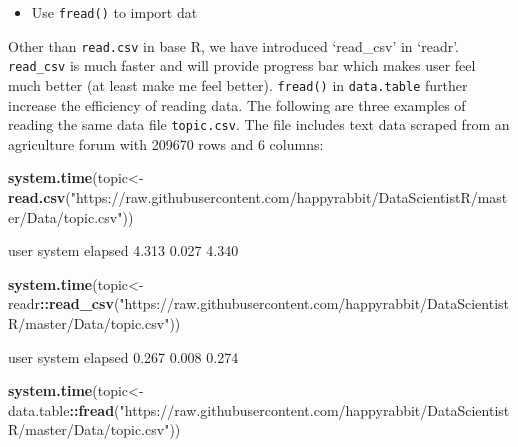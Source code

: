 \documentclass[12pt,]{krantz}
\makeatletter
\newenvironment{Shaded}{\begin{snugshade}}{\end{snugshade}}
\newcommand{\KeywordTok}[1]{\textcolor[rgb]{0.27,0.27,0.27}{\textbf{#1}}}
\newcommand{\StringTok}[1]{\textcolor[rgb]{0.5,0.5,0.5}{#1}}
\newcommand{\OperatorTok}[1]{\textcolor[rgb]{0.43,0.43,0.43}{\textbf{#1}}}
\newcommand{\NormalTok}[1]{#1}
\providecommand{\tightlist}{%
  \setlength{\itemsep}{0pt}\setlength{\parskip}{0pt}}
\newenvironment{kframe}{%
\medskip{}
\setlength{\fboxsep}{.8em}
 \def\at@end@of@kframe{}%
 \ifinner\ifhmode%
  \def\at@end@of@kframe{\end{minipage}}%
  \begin{minipage}{\columnwidth}%
 \fi\fi%
 \def\FrameCommand##1{\hskip\@totalleftmargin \hskip-\fboxsep
 \colorbox{shadecolor}{##1}\hskip-\fboxsep
     \hskip-\linewidth \hskip-\@totalleftmargin \hskip\columnwidth}%
 \MakeFramed {\advance\hsize-\width
   \@totalleftmargin\z@ \linewidth\hsize
   \@setminipage}}%
 {\par\unskip\endMakeFramed%
 \at@end@of@kframe}
\renewenvironment{Shaded}{\begin{kframe}}{\end{kframe}}
\theoremstyle{definition}
\theoremstyle{definition}
\theoremstyle{definition}
\theoremstyle{remark}
\makeatother
\begin{document}
\begin{itemize}
\tightlist
\item
  Use \texttt{fread()} to import dat
\end{itemize}

Other than \texttt{read.csv} in base R, we have introduced `read\_csv'
in `readr'. \texttt{read\_csv} is much faster and will provide progress
bar which makes user feel much better (at least make me feel better).
\texttt{fread()} in \texttt{data.table} further increase the efficiency
of reading data. The following are three examples of reading the same
data file \texttt{topic.csv}. The file includes text data scraped from
an agriculture forum with 209670 rows and 6 columns:

\begin{Shaded}
\begin{Highlighting}[]
\KeywordTok{system.time}\NormalTok{(topic<-}\KeywordTok{read.csv}\NormalTok{(}\StringTok{"https://raw.githubusercontent.com/happyrabbit/DataScientistR/master/Data/topic.csv"}\NormalTok{))}
\end{Highlighting}
\end{Shaded}

\begin{Shaded}
\begin{Highlighting}[]
\NormalTok{  user  system elapsed }
\NormalTok{  4.313   0.027   4.340}
\end{Highlighting}
\end{Shaded}

\begin{Shaded}
\begin{Highlighting}[]
\KeywordTok{system.time}\NormalTok{(topic<-readr}\OperatorTok{::}\KeywordTok{read_csv}\NormalTok{(}\StringTok{"https://raw.githubusercontent.com/happyrabbit/DataScientistR/master/Data/topic.csv"}\NormalTok{))}
\end{Highlighting}
\end{Shaded}

\begin{Shaded}
\begin{Highlighting}[]
\NormalTok{   user  system elapsed }
\NormalTok{  0.267   0.008   0.274 }
\end{Highlighting}
\end{Shaded}

\begin{Shaded}
\begin{Highlighting}[]
\KeywordTok{system.time}\NormalTok{(topic<-data.table}\OperatorTok{::}\KeywordTok{fread}\NormalTok{(}\StringTok{"https://raw.githubusercontent.com/happyrabbit/DataScientistR/master/Data/topic.csv"}\NormalTok{))}
\end{Highlighting}
\end{Shaded}
\end{document}
